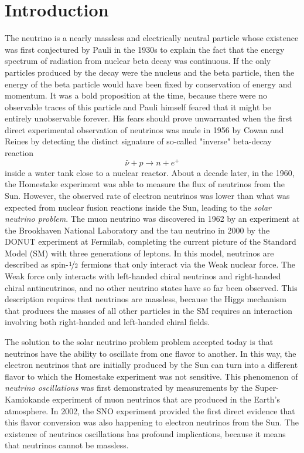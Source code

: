 \setchapterpreamble[u]{\margintoc}
\chapter{Introduction}

The neutrino is a nearly massless and electrically neutral particle whose existence was first conjectured by Pauli in the 1930s to explain the fact that the energy spectrum of radiation from nuclear beta decay was continuous. If the only particles produced by the decay were the nucleus and the beta particle, then the energy of the beta particle would have been fixed by conservation of energy and momentum. It was a bold proposition at the time, because there were no observable traces of this particle and Pauli himself feared that it might be entirely unobservable forever. His fears should prove unwarranted when the first direct experimental observation of neutrinos was made in 1956 by Cowan and Reines\cite{cowan:1956} by detecting the distinct signature of so-called "inverse" beta-decay reaction
\begin{equation}
    \bar{\nu} + p \rightarrow n + e^+
\end{equation}
inside a water tank close to a nuclear reactor. About a decade later, in the 1960, the Homestake experiment was able to measure the flux of neutrinos from the Sun. However, the observed rate of electron neutrinos was lower than what was expected from nuclear fusion reactions inside the Sun, leading to the \emph{solar neutrino problem}. The muon neutrino was discovered in 1962 by an experiment at the Brookhaven National Laboratory\cite{PhysRevLett.9.36} and the tau neutrino in 2000 by the DONUT experiment at Fermilab\cite{Kodama_2001}, completing the current picture of the Standard Model (SM) with three generations of leptons. In this model, neutrinos are described as spin-$\nicefrac{1}{2}$ fermions that only interact via the Weak nuclear force. The Weak force only interacts with left-handed chiral neutrinos and right-handed chiral antineutrinos, and no other neutrino states have so far been observed. This description requires that neutrinos are massless, because the Higgs mechanism that produces the masses of all other particles in the SM requires an interaction involving both right-handed and left-handed chiral fields.

The solution to the solar neutrino problem problem accepted today is that neutrinos have the ability to oscillate from one flavor to another. In this way, the electron neutrinos that are initially produced by the Sun can turn into a different flavor to which the Homestake experiment was not sensitive. This phenomenon of \emph{neutrino oscillations} was first demonstrated by measurements by the Super-Kamiokande experiment of muon neutrinos that are produced in the Earth's atmosphere\cite{PhysRevLett.81.1562}. In 2002, the SNO experiment provided the first direct evidence that this flavor conversion was also happening to electron neutrinos from the Sun\cite{PhysRevLett.89.011301}. The existence of neutrinos oscillations has profound implications, because it means that neutrinos cannot be massless.

